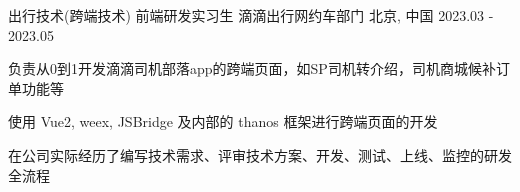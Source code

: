 

\begin{cventries}

    \cventry
    {出行技术(跨端技术) \hspace{1mm} 前端研发实习生} %
    {滴滴出行\hspace{1mm}网约车部门} %
    {北京, 中国} %
    {2023.03 - 2023.05} %
    {
        \begin{cvitems} %
            \item {负责从0到1开发滴滴司机部落app的跨端页面，如SP司机转介绍，司机商城候补订单功能等}
            \item {使用 Vue2, weex, JSBridge 及内部的 thanos 框架进行跨端页面的开发}
            \item {在公司实际经历了编写技术需求、评审技术方案、开发、测试、上线、监控的研发全流程}
        \end{cvitems}
    }

\end{cventries}
